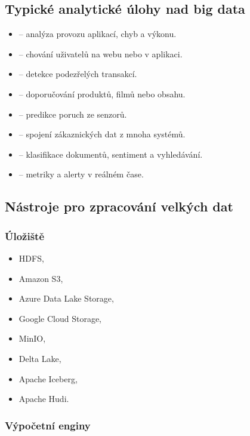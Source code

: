 \subsection{Typické analytické úlohy nad big data}

\begin{itemize}
    \item {} -- analýza provozu aplikací, chyb a výkonu.
    \item {} -- chování uživatelů na webu nebo v aplikaci.
    \item {} -- detekce podezřelých transakcí.
    \item {} -- doporučování produktů, filmů nebo obsahu.
    \item {} -- predikce poruch ze senzorů.
    \item {} -- spojení zákaznických dat z mnoha systémů.
    \item {} -- klasifikace dokumentů, sentiment a vyhledávání.
    \item {} -- metriky a alerty v reálném čase.
\end{itemize}

\subsection{Nástroje pro zpracování velkých dat}

\subsubsection{Úložiště}

\begin{itemize}
    \item HDFS,
    \item Amazon S3,
    \item Azure Data Lake Storage,
    \item Google Cloud Storage,
    \item MinIO,
    \item Delta Lake,
    \item Apache Iceberg,
    \item Apache Hudi.
\end{itemize}

\subsubsection{Výpočetní enginy}

